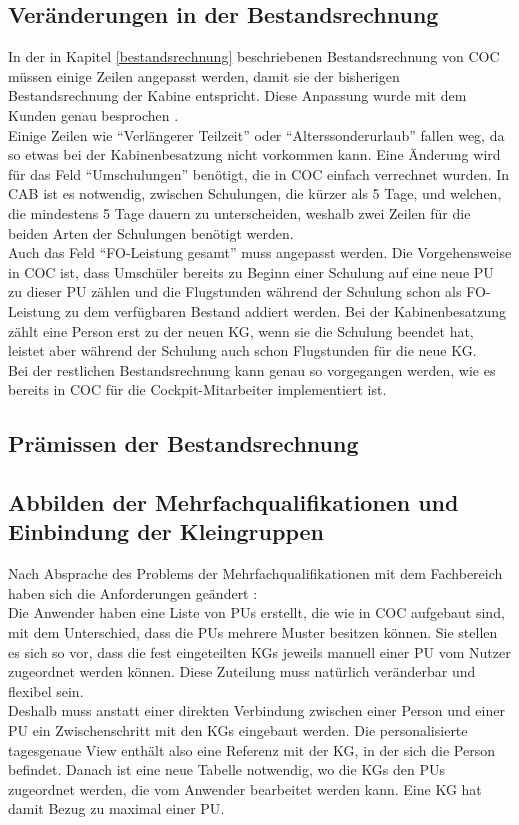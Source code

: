 \documentclass [12pt, a4paper, oneside, titlepage, ngerman]{article}
\begin{document}
\subsection{Veränderungen in der Bestandsrechnung}
In der in Kapitel \ref{bestandsrechnung} beschriebenen Bestandsrechnung von \ac{COC} müssen einige Zeilen angepasst werden, damit sie der bisherigen Bestandsrechnung der Kabine entspricht. Diese Anpassung wurde mit dem Kunden genau besprochen \cite[vgl.][]{bestanddet}. \\
Einige Zeilen wie "`Verlängerer Teilzeit"' oder "`Alterssonderurlaub"' fallen weg, da so etwas bei der Kabinenbesatzung nicht vorkommen kann. Eine Änderung wird für das Feld "`Umschulungen"' benötigt, die in \ac{COC} einfach verrechnet wurden. In \ac{CAB} ist es notwendig, zwischen Schulungen, die kürzer als 5 Tage, und welchen, die mindestens 5 Tage dauern zu unterscheiden, weshalb zwei Zeilen für die beiden Arten der Schulungen benötigt werden. \\ %
Auch das Feld "`FO-Leistung gesamt"' muss angepasst werden. Die Vorgehensweise in \ac{COC} ist, dass Umschüler bereits zu Beginn einer Schulung auf eine neue \ac{PU} zu dieser \ac{PU} zählen und die Flugstunden während der Schulung schon als FO-Leistung zu dem verfügbaren Bestand addiert werden. Bei der Kabinenbesatzung zählt eine Person erst zu der neuen \ac{KG}, wenn sie die Schulung beendet hat, leistet aber während der Schulung auch schon Flugstunden für die neue \ac{KG}. \\%
Bei der restlichen Bestandsrechnung kann genau so vorgegangen werden, wie es bereits in \ac{COC} für die Cockpit-Mitarbeiter implementiert ist.

\subsection{Prämissen der Bestandsrechnung}

\subsection{Abbilden der Mehrfachqualifikationen und Einbindung der Kleingruppen}
Nach Absprache des Problems der Mehrfachqualifikationen mit dem Fachbereich haben sich die Anforderungen geändert \cite[vgl.][]{Gespraech4}: \\
Die Anwender haben eine Liste von \acp{PU} erstellt, die wie in \ac{COC} aufgebaut sind, mit dem Unterschied, dass die \acp{PU} mehrere Muster besitzen können. Sie stellen es sich so vor, dass die fest eingeteilten \acp{KG} jeweils manuell einer \ac{PU} vom Nutzer zugeordnet werden können. Diese Zuteilung muss natürlich veränderbar und flexibel sein. \\
Deshalb muss anstatt einer direkten Verbindung zwischen einer Person und einer \ac{PU} ein Zwischenschritt mit den \acp{KG} eingebaut werden. Die personalisierte tagesgenaue View enthält also eine Referenz mit der \ac{KG}, in der sich die Person befindet. Danach ist eine neue Tabelle notwendig, wo die \acp{KG} den \acp{PU} zugeordnet werden, die vom Anwender bearbeitet werden kann. Eine \ac{KG} hat damit Bezug zu maximal einer \ac{PU}. \\
\end{document}

